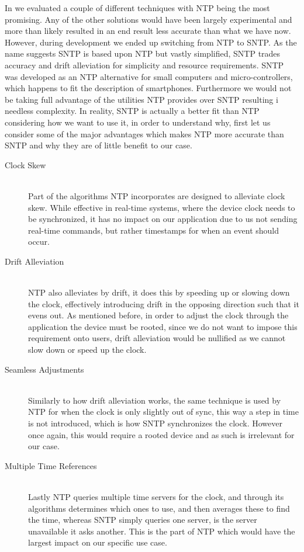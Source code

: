 \bigskip
In  we evaluated a couple of different techniques with \ac{NTP} being the most promising.
Any of the other solutions would have been largely experimental and more than likely resulted in an end result less accurate than what we have now.
However, during development we ended up switching from \ac{NTP} to \ac{SNTP}.
As the name suggests \ac{SNTP} is based upon \ac{NTP} but vastly simplified, \ac{SNTP} trades accuracy and drift alleviation for simplicity and resource requirements.
\ac{SNTP} was developed as an \ac{NTP} alternative for small computers and micro-controllers, which happens to fit the description of smartphones.
Furthermore we would not be taking full advantage of the utilities \ac{NTP} provides over \ac{SNTP} resulting i needless complexity.
In reality, \ac{SNTP} is actually a better fit than \ac{NTP} considering how we want to use it, in order to understand why, first let us consider some of the major advantages which makes \ac{NTP} more accurate than \ac{SNTP} and why they are of little benefit to our case.\cite{sntp_ntp}
\begin{description}
    \item [Clock Skew] \hfill \\
    Part of the algorithms \ac{NTP} incorporates are designed to alleviate clock skew.
    While effective in real-time systems, where the device clock needs to be synchronized, it has no impact on our application due to us not sending real-time commands, but rather timestamps for when an event should occur.
    \item [Drift Alleviation] \hfill \\
    \ac{NTP} also alleviates by drift, it does this by speeding up or slowing down the clock, effectively introducing drift in the opposing direction such that it evens out.
    As mentioned before, in order to adjust the clock through the application the device must be rooted, since we do not want to impose this requirement onto users, drift alleviation would be nullified as we cannot slow down or speed up the clock.
    \item [Seamless Adjustments] \hfill \\
    Similarly to how drift alleviation works, the same technique is used by \ac{NTP} for when the clock is only slightly out of sync, this way a step in time is not introduced, which is how \ac{SNTP} synchronizes the clock.
    However once again, this would require a rooted device and as such is irrelevant for our case.
    \item [Multiple Time References] \hfill \\
    Lastly \ac{NTP} queries multiple time servers for the clock, and through its algorithms determines which ones to use, and then averages these to find the time, whereas \ac{SNTP} simply queries one server, is the server unavailable it asks another.
    This is the part of \ac{NTP} which would have the largest impact on our specific use case.
\end{description}
